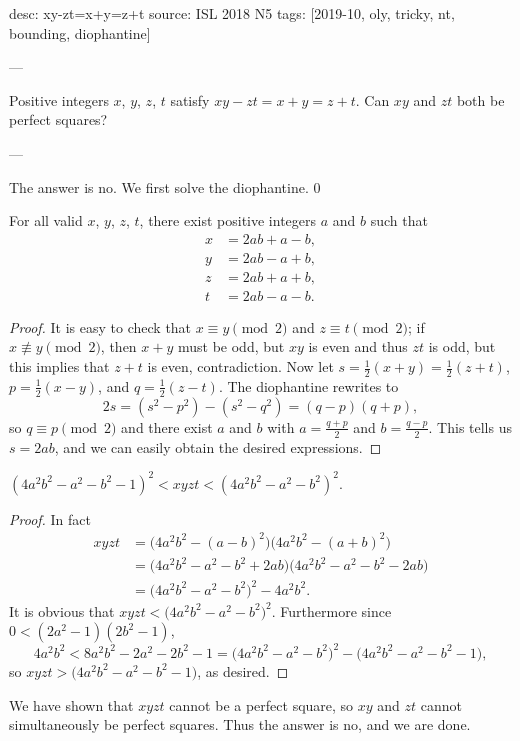 desc: xy-zt=x+y=z+t
source: ISL 2018 N5
tags: [2019-10, oly, tricky, nt, bounding, diophantine]

---

Positive integers $x$, $y$, $z$, $t$ satisfy $xy-zt=x+y=z+t$. Can $xy$ and $zt$ both be perfect squares?

---

The answer is $\boxed{\text{no}}$. We first solve the diophantine.
\setcounter{iclaim}0
\begin{iclaim}
    For all valid $x$, $y$, $z$, $t$, there exist positive integers $a$ and $b$ such that
    \begin{align*}
        x&=2ab+a-b,\\
        y&=2ab-a+b,\\
        z&=2ab+a+b,\\
        t&=2ab-a-b.
    \end{align*}
\end{iclaim}
\begin{proof}
    It is easy to check that $x\equiv y\pmod2$ and $z\equiv t\pmod2$; if $x\not\equiv y\pmod2$, then $x+y$ must be odd, but $xy$ is even and thus $zt$ is odd, but this implies that $z+t$ is even, contradiction. Now let $s=\tfrac12(x+y)=\tfrac12(z+t)$, $p=\tfrac12(x-y)$, and $q=\tfrac12(z-t)$. The diophantine rewrites to \[2s=(s^2-p^2)-(s^2-q^2)=(q-p)(q+p),\]
    so $q\equiv p\pmod2$ and there exist $a$ and $b$ with $a=\tfrac{q+p}2$ and $b=\tfrac{q-p}2$. This tells us $s=2ab$, and we can easily obtain the desired expressions.
\end{proof}
\begin{iclaim}
    $(4a^2b^2-a^2-b^2-1)^2<xyzt<(4a^2b^2-a^2-b^2)^2$.
\end{iclaim}
\begin{proof}
    In fact
    \begin{align*}
        xyzt&=\big(4a^2b^2-(a-b)^2\big)\big(4a^2b^2-(a+b)^2\big)\\
        &=\big(4a^2b^2-a^2-b^2+2ab\big)\big(4a^2b^2-a^2-b^2-2ab\big)\\
        &=\big(4a^2b^2-a^2-b^2)^2-4a^2b^2.
    \end{align*}
    It is obvious that $xyzt<\big(4a^2b^2-a^2-b^2\big)^2$. Furthermore since $0<(2a^2-1)(2b^2-1)$, \[4a^2b^2<8a^2b^2-2a^2-2b^2-1=\big(4a^2b^2-a^2-b^2\big)^2-\big(4a^2b^2-a^2-b^2-1\big),\]
    so $xyzt>\big(4a^2b^2-a^2-b^2-1\big)$, as desired.
\end{proof}

We have shown that $xyzt$ cannot be a perfect square, so $xy$ and $zt$ cannot simultaneously be perfect squares. Thus the answer is no, and we are done.
